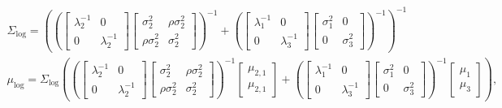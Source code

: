 \begin{gather}
  \Sigma_{\text{log}} = 
  \left(
    \left(
      \begin{bmatrix}
        \lambda_{2}^{-1} & 0 \\
        0 & \lambda_{2}^{-1}
      \end{bmatrix}
      \begin{bmatrix}
        \sigma_{2}^{2} & \rho\sigma_{2}^{2} \\
        \rho\sigma_{2}^{2} & \sigma_{2}^{2}
      \end{bmatrix}
    \right)^{-1}
    +
    \left(
        \begin{bmatrix}
          \lambda_{1}^{-1} & 0 \\
          0 & \lambda_{3}^{-1}
        \end{bmatrix}
        \begin{bmatrix}
          \sigma_{1}^{2} & 0 \\
          0 & \sigma_{3}^{2}
        \end{bmatrix}
    \right)^{-1} 
  \right)^{-1}
  \label{eqn:log-pooling-gaussian-one} \\
  \mu_{\text{log}} = 
  \Sigma_{\text{log}} 
  \left(
    \left(
      \begin{bmatrix}
        \lambda_{2}^{-1} & 0 \\
        0 & \lambda_{2}^{-1}
      \end{bmatrix}
      \begin{bmatrix}
        \sigma_{2}^{2} & \rho\sigma_{2}^{2} \\
        \rho\sigma_{2}^{2} & \sigma_{2}^{2}
      \end{bmatrix}
    \right)^{-1}
    \begin{bmatrix}
    \mu_{2, 1} \\
    \mu_{2, 1}
    \end{bmatrix}
    +
    \left(
        \begin{bmatrix}
          \lambda_{1}^{-1} & 0 \\
          0 & \lambda_{3}^{-1}
        \end{bmatrix}
        \begin{bmatrix}
          \sigma_{1}^{2} & 0 \\
          0 & \sigma_{3}^{2}
        \end{bmatrix}
    \right)^{-1}
    \begin{bmatrix}
    \mu_{1} \\
    \mu_{3}
    \end{bmatrix}
  \right),
  \label{eqn:log-pooling-gaussian-two}
\end{gather}
